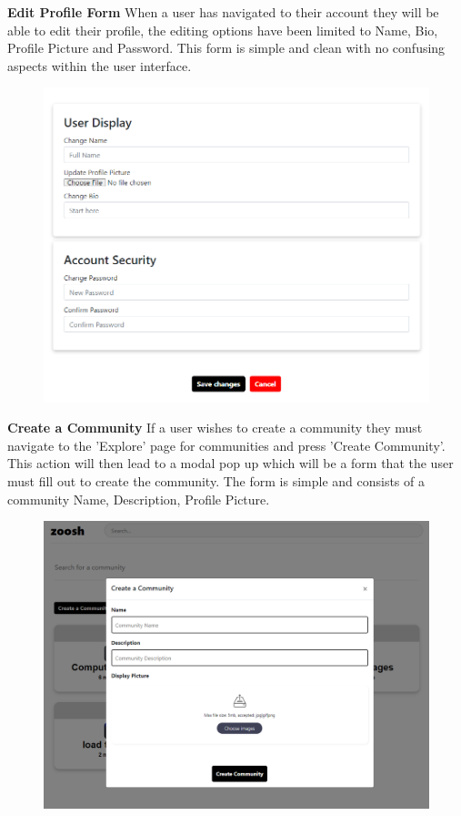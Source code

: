 \newpage
\textbf{Edit Profile Form}
\newline
When a user has navigated to their account they will be able to edit their profile, the editing options have been limited to Name, Bio, Profile Picture and Password. This form is simple and clean with no confusing aspects within the user interface.

\begin{figure}[H]
  \centering
  \includegraphics[scale=0.45]{img/edit.PNG}
  \label{fig:Edit Profile Screen.}
\end{figure}

\textbf{Create a Community}
\newline
If a user wishes to create a community they must navigate to the 'Explore' page for communities and press 'Create Community'. This action will then lead to a modal pop up which will be a form that the user must fill out to create the community. The form is simple and consists of a community Name, Description, Profile Picture.

\begin{figure}[H]
  \centering
  \includegraphics[scale=0.35]{img/createcommunity.PNG}
  \label{fig:Create Community Modal Form.}
\end{figure}

